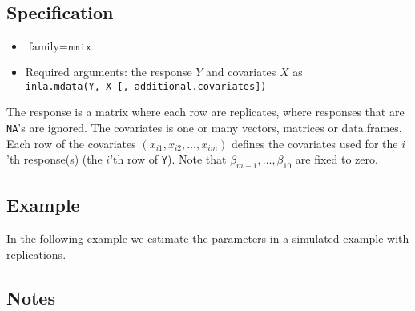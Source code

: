 \documentclass[a4paper,11pt]{article}
\def\mmax{10}
\begin{document}
\subsection*{Specification}

\begin{itemize}
\item $\text{family}=\texttt{nmix}$
\item Required arguments: the response $Y$ and covariates $X$ as\\
    \verb|inla.mdata(Y, X [, additional.covariates])|
\end{itemize}
The response is a matrix where each row are replicates, where
responses that are \texttt{NA}'s are ignored. The covariates is one or
many vectors, matrices or data.frames. Each row of the covariates
$(x_{i1}, x_{i2}, \ldots, x_{im})$ defines the covariates used for the
$i$'th response(s) (the $i$'th row of \texttt{Y}). Note that 
$\beta_{m+1}, \ldots, \beta_{\mmax}$ are fixed to zero.


\subsection*{Example}

In the following example we estimate the parameters in a simulated
example with replications.


\subsection*{Notes}
\end{document}
